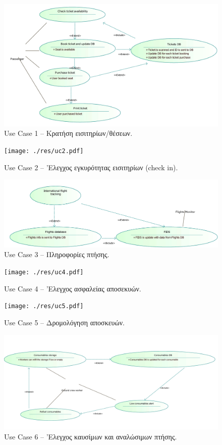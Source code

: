 \documentclass[12pt]{article}
\begin{document}
\begin{figure}[H]
	\centering
	\includegraphics[width=\linewidth]{./res/uc1.pdf}
	\caption{Use Case 1 -- Κρατήση εισιτηρίων/θέσεων.}
\end{figure}

\begin{figure}[H]
	\centering
	\texttt{[image: ./res/uc2.pdf]}
	\caption{Use Case 2 -- 'Ελεγχος εγκυρότητας εισιτηρίων (check in).}
\end{figure}

\begin{figure}[H]
	\centering
	\includegraphics[width=\linewidth]{./res/uc3.pdf}
	\caption{Use Case 3 -- Πληροφορίες πτήσης.}
\end{figure}

\begin{figure}[H]
	\centering
	\texttt{[image: ./res/uc4.pdf]}
	\caption{Use Case 4 -- 'Ελεγχος ασφαλείας αποσεκυών.}
\end{figure}

\begin{figure}[H]
	\centering
	\texttt{[image: ./res/uc5.pdf]}
	\caption{Use Case 5 -- Δρομολόγηση αποσκευών.}
\end{figure}

\begin{figure}[H]
	\centering
	\includegraphics[width=\linewidth]{./res/uc6.pdf}
	\caption{Use Case 6 -- 'Ελεγχος καυσίμων και αναλώσιμων πτήσης.}
\end{figure}
\end{document}
